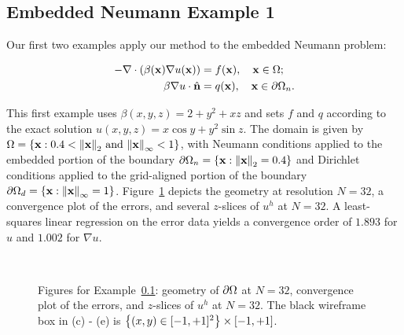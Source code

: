 \subsection{Embedded Neumann Example 1} \label{subsec:ch4.examples.neumann.1}

Our first two examples apply our method to the embedded Neumann problem:

\begin{align*}
-\nabla \cdot \left( \beta(\mathbf{x}) \nabla u(\mathbf{x}) \right) & = f(\mathbf{x}), \quad \mathbf{x} \in \Omega; \\
\beta \nabla u \cdot \hat{\mathbf{n}} & = q(\mathbf{x}), \quad \mathbf{x} \in \partial\Omega_n.
\end{align*}

This first example uses $\beta(x,y,z) = 2 + y^2 + xz$ and sets $f$ and $q$ according to the exact solution $u(x,y,z) = x \cos y + y^2 \sin z$. The domain is given by $\Omega = \left\lbrace  \mathbf{x} : 0.4 < \left\lVert \mathbf{x} \right\rVert_2 \, \text{and} \, \left\lVert \mathbf{x} \right\rVert_{\infty} < 1  \right\rbrace$, with Neumann conditions applied to the embedded portion of the boundary $\dOmega_n = \linebreak[4] \set{ \bfx : \norm{\bfx}_2 = 0.4 }$ and Dirichlet conditions applied to the grid-aligned portion of the boundary $\partial\Omega_d = \left\lbrace  \mathbf{x} : \left\lVert \mathbf{x} \right\rVert_{\infty} = 1  \right\rbrace$. Figure~\ref{fig:ch4.examples.neumann.1} depicts the geometry at resolution $N = 32$, a convergence plot of the errors, and several $z$-slices of $u^h$ at $N = 32$. A least-squares linear regression on the error data yields a convergence order of $1.893$ for $u$ and $1.002$ for $\nabla u$.

\setlength{\figureheighti}{0.26\columnwidth}
\setlength{\figurewidthii}{0.32\columnwidth}
\begin{figure}[htbp]
\begin{center}
 \\
\caption{Figures for Example~\ref{subsec:ch4.examples.neumann.1}: geometry of $\partial\Omega$ at $N = 32$, convergence plot of the errors, and $z$-slices of $u^h$ at $N = 32$. The black wireframe box in (c) - (e) is $\left\lbrace  (x,y) \in [-1,+1]^2  \right\rbrace \times [-1,+1]$.}
\label{fig:ch4.examples.neumann.1}
\end{center}
\end{figure}

